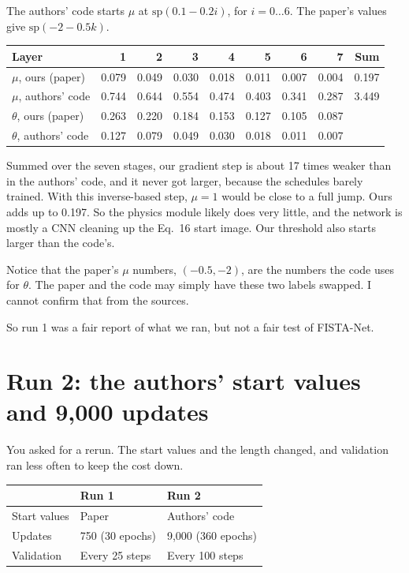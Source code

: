 The authors' code starts $\mu$ at $\mathrm{sp}(0.1-0.2i)$, for $i=0\dots6$. The paper's values give $\mathrm{sp}(-2-0.5k)$.

\begin{center}
\begin{tabular}{lrrrrrrrr}
\toprule
Layer & 1 & 2 & 3 & 4 & 5 & 6 & 7 & Sum \\
\midrule
$\mu$, ours (paper) & 0.079 & 0.049 & 0.030 & 0.018 & 0.011 & 0.007 & 0.004 & 0.197 \\
$\mu$, authors' code & 0.744 & 0.644 & 0.554 & 0.474 & 0.403 & 0.341 & 0.287 & 3.449 \\
\midrule
$\theta$, ours (paper) & 0.263 & 0.220 & 0.184 & 0.153 & 0.127 & 0.105 & 0.087 & \\
$\theta$, authors' code & 0.127 & 0.079 & 0.049 & 0.030 & 0.018 & 0.011 & 0.007 & \\
\bottomrule
\end{tabular}
\end{center}

Summed over the seven stages, our gradient step is about 17 times weaker than in the authors' code, and it never got
larger, because the schedules barely trained. With this inverse-based step, $\mu=1$ would be close to a full jump. Ours adds up to
0.197. So the physics module likely does very little, and the network is mostly a CNN cleaning up the Eq.~16 start image. Our
threshold also starts larger than the code's.

Notice that the paper's $\mu$ numbers, $(-0.5,-2)$, are the numbers the code uses for $\theta$. The paper and the
code may simply have these two labels swapped. I cannot confirm that from the sources.

So run 1 was a fair report of what we ran, but not a fair test of FISTA-Net.

\section{Run 2: the authors' start values and 9,000 updates}

You asked for a rerun. The start values and the length changed, and validation ran less often to keep the cost down.

\begin{center}
\begin{tabular}{lll}
\toprule
 & Run 1 & Run 2 \\
\midrule
Start values & Paper & Authors' code \\
Updates & 750 (30 epochs) & 9,000 (360 epochs) \\
Validation & Every 25 steps & Every 100 steps \\
\bottomrule
\end{tabular}
\end{center}

